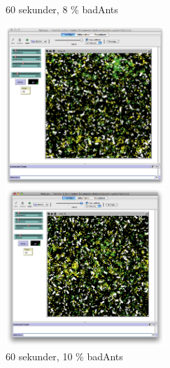 \documentclass[titlepage, a4paper, 12pt]{article}
\begin{document}
\begin{figure}
  \begin{minipage}[b]{0.5\linewidth} %
    \centering
    \caption{60 sekunder, 8 \% badAnts}
    \includegraphics[width=6cm]{images/40-bad-60.png}
  \end{minipage}
  \hspace{0.5cm} %
  \begin{minipage}[b]{0.5\linewidth}
    \centering
    \caption{60 sekunder, 10 \% badAnts}
    \includegraphics[width=6cm]{images/50-bad-60.png}
  \end{minipage}
  

\end{figure}
\end{document}
